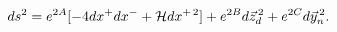 \begin{equation}
ds^2=e^{2A}[-4dx^+dx^-+{\cal H}dx^{+\,2}]+e^{2B}d\vec z_d^{\,2} +
e^{2C}d\vec y_n^{\,2}.
\end{equation}

